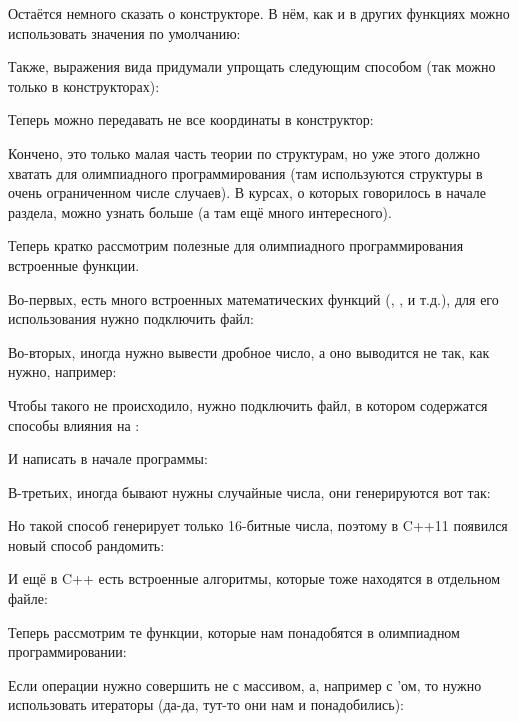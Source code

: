 
Остаётся немного сказать о конструкторе. В нём, как и в других функциях можно использовать значения по умолчанию:


Также, выражения вида  придумали упрощать следующим способом (так можно только в конструкторах):


Теперь можно передавать не все координаты в конструктор:


Кончено, это только малая часть теории по структурам, но уже этого должно хватать для олимпиадного программирования (там используются структуры в очень ограниченном числе случаев). В курсах, о которых говорилось в начале раздела, можно узнать больше (а там ещё много интересного).


\hypertarget{built-in function}{}
Теперь кратко рассмотрим полезные для олимпиадного программирования встроенные функции.

Во-первых, есть много встроенных математических функций (, ,  и т.д.), для его использования нужно подключить файл:


Во-вторых, иногда нужно вывести дробное число, а оно выводится не так, как нужно, например:


Чтобы такого не происходило, нужно подключить файл, в котором содержатся способы влияния на :


И написать в начале программы:


В-третьих, иногда бывают нужны случайные числа, они генерируются вот так:


Но такой способ генерирует только 16-битные числа, поэтому в C++11 появился новый способ рандомить:


И ещё в C++ есть встроенные алгоритмы, которые тоже находятся в отдельном файле:


Теперь рассмотрим те функции, которые нам понадобятся в олимпиадном программировании:


Если операции нужно совершить не с массивом, а, например с 'ом, то нужно использовать итераторы (да-да, тут-то они нам и понадобились):

